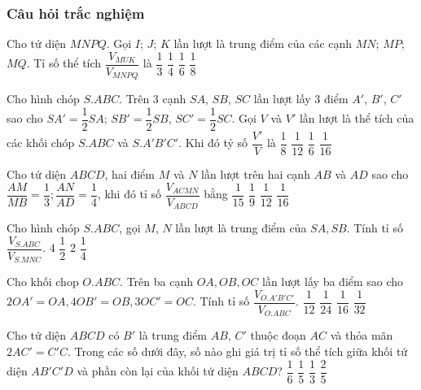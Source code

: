 \subsubsection{Câu hỏi trắc nghiệm}
\begin{ex}%
	Cho tứ diện $MNPQ$. Gọi $I$; $J$; $K$ lần lượt là trung điểm của các cạnh $MN$; $MP$; $MQ$. Tỉ số thể tích $\dfrac{V_{MUK}}{V_{MNPQ}}$ là
	\choice
	{$\dfrac{1}{3}$}
	{$\dfrac{1}{4}$}
	{$\dfrac{1}{6}$}
	{\True $\dfrac{1}{8}$}
\end{ex}

\begin{ex}%
	Cho hình chóp $S.ABC$. Trên 3 cạnh $SA$, $SB$, $SC$ lần lượt lấy 3 điểm $A'$, $B'$, $C'$ sao cho $SA'=\dfrac{1}{2}SA$; $SB'=\dfrac{1}{2}SB$, $SC'=\dfrac{1}{2}SC$. Gọi $V$ và $V'$ lần lượt là thể tích của các khối chóp $S.ABC$ và $S.A'B'C'$. Khi đó tỷ số $\dfrac{V'}{V}$ là
	\choice
	{$\dfrac{1}{8}$}
	{\True $\dfrac{1}{12}$}
	{$\dfrac{1}{6}$}
	{$\dfrac{1}{16}$}
\end{ex}

\begin{ex}%
	Cho tứ diện $ABCD$, hai điểm $M$ và $N$ lần lượt trên hai cạnh $AB$ và $AD$ sao cho $\dfrac{AM}{MB}=\dfrac{1}{3};\dfrac{AN}{AD}=\dfrac{1}{4}$, khi đó tỉ số $\dfrac{V_{ACMN}}{V_{ABCD}}$ bằng
	\choice
	{$\dfrac{1}{15}$}
	{$\dfrac{1}{9}$}
	{\True $\dfrac{1}{12}$}
	{$\dfrac{1}{16}$}
\end{ex}

\begin{ex}%
	Cho hình chóp $S.ABC$, gọi $M$, $N$ lần lượt là trung điểm của $SA, SB$. Tính tỉ số $\dfrac{V_{S.ABC}}{V_{S.MNC}}$. 
	\choice
	{\True $4$}
	{$\dfrac{1}{2}$}
	{$2$}
	{$\dfrac{1}{4}$}
\end{ex}

\begin{ex}%
	Cho khối chop $O.ABC$. Trên ba cạnh $OA,OB,OC$ lần lượt lấy ba điểm sao cho $2OA'=OA, 4OB'=OB, 3OC'=OC$. Tính tỉ số $\dfrac{V_{O.A'B'C'}}{V_{O.ABC}}$. 
	\choice
	{$\dfrac{1}{12}$}
	{\True $\dfrac{1}{24}$}
	{$\dfrac{1}{16}$}
	{$\dfrac{1}{32}$}
\end{ex}

\begin{ex}%
	Cho tứ diện $ABCD$ có $B'$ là trung điểm $AB$, $C'$ thuộc đoạn $AC$ và thỏa mãn $2AC'=C'C$. Trong các số dưới đây, số nào ghi giá trị tỉ số thể tích giữa khối tứ diện $AB'C'D$ và phần còn lại của khối tứ diện $ABCD$?
	\choice
	{$\dfrac{1}{6}$}
	{\True $\dfrac{1}{5}$}
	{$\dfrac{1}{3}$}
	{$\dfrac{2}{5}$}
\end{ex}

